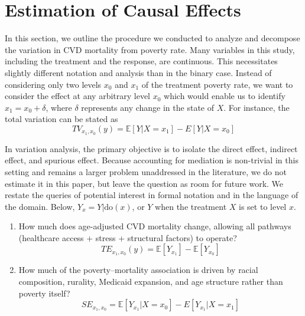 \documentclass{article}
\theoremstyle{plain}
\theoremstyle{definition}
\theoremstyle{remark}
\begin{document}
\section{Estimation of Causal Effects}
\label{estimation}

In this section, we outline the procedure we conducted to analyze and decompose the variation in CVD mortality from poverty rate.
Many variables in this study, including the treatment and the response, are continuous. This necessitates slightly
different notation and analysis than in the binary case. Instead of considering only two levels $x_0$ and $x_1$ of the treatment poverty rate, we want to consider the effect at any arbitrary level $x_0$ which would enable us to identify
$x_1 = x_0 + \delta$, where $\delta$ represents any change in the state of $X$.
For instance,
the total variation can be stated as
$$TV_{x_1,x_0}(y)=\mathbb E[Y|X=x_1]-E[Y|X=x_0]$$

In variation analysis, the primary objective is to isolate the direct effect,
indirect effect, and spurious effect. Because accounting for mediation is non-trivial in this setting and remains a larger problem unaddressed in the literature, we do not estimate it in this paper, but leave the question as room for future work. We restate the queries of potential interest in formal notation and in the language of the domain.
Below, $Y_x = Y|\text{do}(x)$, or $Y$ when the treatment $X$ is set to
level $x$.


\begin{enumerate}
    \item How much does age-adjusted CVD mortality change,
allowing all pathways (healthcare access + stress + structural factors) to operate?
    $$TE_{x_1,x_0}(y) = \mathbb E[Y_{x_1}]-\mathbb E[Y_{x_0}]$$
    \item How much of the poverty–mortality association is driven by
racial composition,
rurality,
Medicaid expansion, and 
age structure
rather than poverty itself?
    $$SE_{x_1,x_0}=\mathbb E[Y_{x_1}|X=x_0] - E[Y_{x_1}|X=x_1]$$
\end{enumerate}
\end{document}
